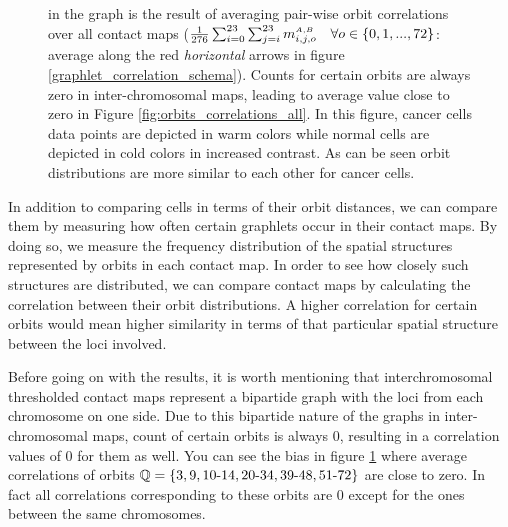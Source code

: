 \documentclass[a4,center,fleqn]{NAR}
\begin{document}
\begin{figure}
{        in the graph is the result of averaging pair-wise
        orbit correlations over all contact maps
        ($\frac{1}{276}\sum_{i=0}^{23}\sum_{j=i}^{23}{
        m^{\scriptscriptstyle \scriptscriptstyle A,B}_{i,j, o}} \quad 
        \forall o \in \{0, 1, ..., 72\}$:
        average along the red \textit{horizontal} arrows in figure 
        \ref{graphlet_correlation_schema}).
        Counts for certain orbits are always zero in inter-chromosomal
        maps, leading to average value close to zero in 
        Figure \ref{fig:orbits_correlations_all}.
        In this figure, cancer cells data points are depicted
        in warm colors while normal cells are depicted in
        cold colors in increased contrast. As can be seen
        orbit distributions are more similar to each other
        for cancer cells.
    }
    \label{fig:orbits_correlations}
\end{figure}

In addition to comparing cells in terms of their
orbit distances, we can compare them by measuring how
often certain graphlets occur in their contact maps. By
doing so, we measure the frequency distribution of the spatial
structures represented by orbits in each contact map. In order
to see how closely such structures are distributed, we can
compare contact maps by calculating the correlation between
their orbit distributions. A higher correlation for certain orbits
would mean higher similarity in terms of that particular spatial
structure between the loci involved.

Before going on with the results,
it is worth mentioning that interchromosomal 
thresholded contact maps 
represent
a bipartide graph with the loci from each chromosome 
on one side. Due to this
bipartide nature of the graphs in inter-chromosomal maps,
count of certain orbits is always 0, resulting in
a correlation values of 0 for them as well.
You can see the bias in 
figure \ref{fig:orbits_correlations} where 
average correlations of orbits
$\mathbb{Q} = \{3, 9, 10{\text -}14, 20{\text -}34, 39{\text -}48, 51{\text -}72\}$ 
are close to zero. In fact all correlations
corresponding to these orbits are 0 except for the ones between 
the same 
chromosomes.
\end{document}
